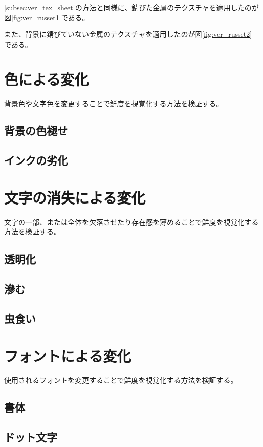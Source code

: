 \ref{subsec:ver_tex_sheet}の方法と同様に、錆びた金属のテクスチャを適用したのが図\ref{fig:ver_russet1}である。

また、背景に錆びていない金属のテクスチャを適用したのが図\ref{fig:ver_russet2}である。

\section{色による変化}

背景色や文字色を変更することで鮮度を視覚化する方法を検証する。

\subsection{背景の色褪せ}
\subsection{インクの劣化}

\section{文字の消失による変化}

文字の一部、または全体を欠落させたり存在感を薄めることで鮮度を視覚化する方法を検証する。

\subsection{透明化}
\subsection{滲む}
\subsection{虫食い}

\section{フォントによる変化}

使用されるフォントを変更することで鮮度を視覚化する方法を検証する。

\subsection{書体}
\subsection{ドット文字}

